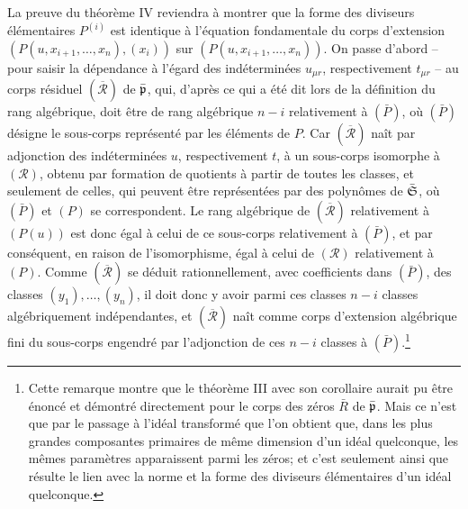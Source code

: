 La preuve du théorème IV reviendra à montrer que la forme des diviseurs élémentaires $P^{(i)}$ est identique à l'équation fondamentale du corps d'extension $(P(u,x_{i+1},\ldots,x_n),(x_i))$ sur $(P(u,x_{i+1},\ldots,x_n))$. On passe d'abord -- pour saisir la dépendance à l'égard des indéterminées $u_{\mu r}$, respectivement $t_{\mu r}$ -- au corps résiduel $(\overline{\mathcal R})$ de $\bar{\mathfrak p}$, qui, d'après ce qui a été dit lors de la définition du rang algébrique, doit être de rang algébrique $n-i$ relativement à $(\bar P)$, où $(\bar P)$ désigne le sous-corps représenté par les éléments de $P$. Car $(\overline{\mathcal R})$ naît par adjonction des indéterminées $u$, respectivement $t$, à un sous-corps isomorphe à $(\mathcal R)$, obtenu par formation de quotients à partir de toutes les classes, et seulement de celles, qui peuvent être représentées par des polynômes de $\bar{\mathfrak S}$, où $(\bar P)$ et $(P)$ se correspondent. Le rang algébrique de $(\overline{\mathcal R})$ relativement à $(P(u))$ est donc égal à celui de ce sous-corps relativement à $(\bar P)$, et par conséquent, en raison de l'isomorphisme, égal à celui de $(\mathcal R)$ relativement à $(P)$. Comme $(\overline{\mathcal R})$ se déduit rationnellement, avec coefficients dans $(\bar P)$, des classes $(y_1),\ldots,(y_n)$, il doit donc y avoir parmi ces classes $n-i$ classes algébriquement indépendantes, et $(\overline{\mathcal R})$ naît comme corps d'extension algébrique fini du sous-corps engendré par l'adjonction de ces $n-i$ classes à $(\bar P)$.\footnote{Cette remarque montre que le théorème III avec son corollaire aurait pu être énoncé et démontré directement pour le corps des zéros $\bar R$ de $\bar{\mathfrak p}$. Mais ce n'est que par le passage à l'idéal transformé que l'on obtient que, dans les plus grandes composantes primaires de même dimension d'un idéal quelconque, les mêmes paramètres apparaissent parmi les zéros; et c'est seulement ainsi que résulte le lien avec la norme et la forme des diviseurs élémentaires d'un idéal quelconque.}

